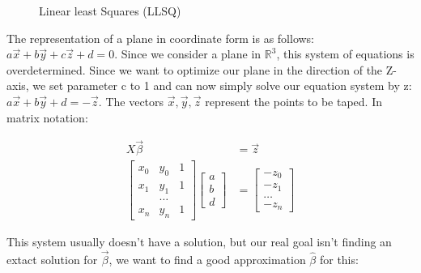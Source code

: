 \documentclass[11pt,oneside,openright]{mpreport}
\begin{document}
\begin{figure}[!ht]
\caption{Linear least Squares (LLSQ)  \cite{LLSQ}}

\label{LLSQ_MIN}
\end{figure}


The representation of a plane in coordinate form is as follows: $ a\vec{x} + b\vec{y} + c\vec{z} + d = 0 $. Since we consider a plane in $\mathbb{R}^3$, this system of equations is overdetermined.
Since we want to optimize our plane in the direction of the Z-axis, we set parameter c to 1 and can now simply solve our equation system by z: $a\vec{x} + b\vec{y} + d = -\vec{z}$.
The vectors $\vec{x},\vec{y},\vec{z}$ represent the points to be taped.
In matrix notation:

\begin{align*}
X \vec{\beta} &= \vec{z}\\
\begin{bmatrix}
x_0 & y_0 & 1 \\
x_1 & y_1 & 1 \\
 & \dots & \\
x_n & y_n & 1 
\end{bmatrix} 
\begin{bmatrix}
a \\
b \\
d 
\end{bmatrix}
&= 
\begin{bmatrix}
-z_0 \\
-z_1 \\
\dots \\
-z_n 
\end{bmatrix} 
\end{align*}

This system usually doesn't have a solution, but our real goal isn't finding an extact solution for $\vec\beta$, we want to find a good approximation $\hat{\beta}$ for this:
\end{document}
